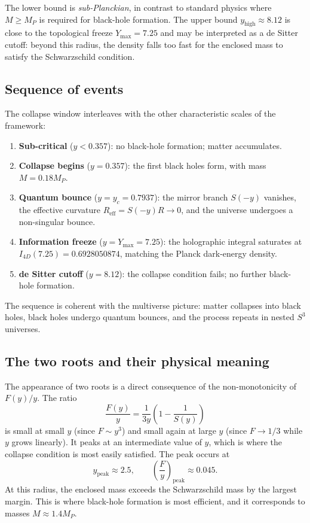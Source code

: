 \documentclass[a4paper,1pt,oneside,openany]{book}
\begin{document}
The lower bound is \emph{sub-Planckian}, in contrast to 
standard physics where $M\ge M_{P}$ is required for black-hole 
formation. The upper bound $y_{\text{high}}\approx 8.12$ is 
close to the topological freeze $Y_{\max}=7.25$ and may be 
interpreted as a de Sitter cutoff: beyond this radius, the 
density falls too fast for the enclosed mass to satisfy the 
Schwarzschild condition.

\subsection{Sequence of events}

The collapse window interleaves with the other characteristic 
scales of the framework:
\begin{enumerate}
\item \textbf{Sub-critical} ($y<0.357$): no black-hole 
formation; matter accumulates.
\item \textbf{Collapse begins} ($y=0.357$): the first black 
holes form, with mass $M=0.18 M_{P}$.
\item \textbf{Quantum bounce} ($y=y_{c}=0.7937$): the mirror 
branch $S(-y)$ vanishes, the effective curvature 
$R_{\text{eff}}=S(-y)R\to 0$, and the universe undergoes a 
non-singular bounce.
\item \textbf{Information freeze} ($y=Y_{\max}=7.25$): the 
holographic integral saturates at 
$I_{4D}(7.25)=0.6928050874$, matching the Planck dark-energy 
density.
\item \textbf{de Sitter cutoff} ($y=8.12$): the collapse 
condition fails; no further black-hole formation.
\end{enumerate}
The sequence is coherent with the multiverse picture: matter 
collapses into black holes, black holes undergo quantum 
bounces, and the process repeats in nested $S^{3}$ universes.

\subsection{The two roots and their physical meaning}

The appearance of two roots is a direct consequence of the 
non-monotonicity of $F(y)/y$. The ratio
\begin{equation}
\frac{F(y)}{y}
=
\frac{1}{3y}\left(1-\frac{1}{S(y)}\right)
\label{eq:F-over-y}
\end{equation}
is small at small $y$ (since $F\sim y^{3}$) and small again at 
large $y$ (since $F\to 1/3$ while $y$ grows linearly). It peaks 
at an intermediate value of $y$, which is where the collapse 
condition is most easily satisfied. The peak occurs at
\begin{equation}
y_{\text{peak}}\approx 2.5,
\qquad
\left(\frac{F}{y}\right)_{\text{peak}}\approx 0.045.
\label{eq:peak}
\end{equation}
At this radius, the enclosed mass exceeds the Schwarzschild 
mass by the largest margin. This is where black-hole formation 
is most efficient, and it corresponds to masses 
$M\approx 1.4 M_{P}$.
\end{document}
